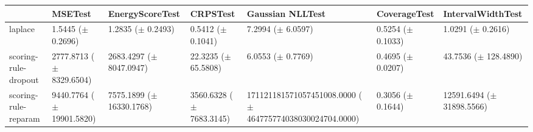 \begin{tabular}{lllllll}
\toprule
 & MSETest & EnergyScoreTest & CRPSTest & Gaussian NLLTest & CoverageTest & IntervalWidthTest \\
\midrule
laplace & \makecell{1.5445 \\ ($\pm$ 0.2696)} & \makecell{1.2835 \\ ($\pm$ 0.2493)} & \makecell{0.5412 \\ ($\pm$ 0.1041)} & \makecell{7.2994 \\ ($\pm$ 6.0597)} & \makecell{0.5254 \\ ($\pm$ 0.1033)} & \makecell{1.0291 \\ ($\pm$ 0.2616)} \\
scoring-rule-dropout & \makecell{2777.8713 \\ ($\pm$ 8329.6504)} & \makecell{2683.4297 \\ ($\pm$ 8047.0947)} & \makecell{22.3235 \\ ($\pm$ 65.5808)} & \makecell{6.0553 \\ ($\pm$ 0.7769)} & \makecell{0.4695 \\ ($\pm$ 0.0207)} & \makecell{43.7536 \\ ($\pm$ 128.4890)} \\
scoring-rule-reparam & \makecell{9440.7764 \\ ($\pm$ 19901.5820)} & \makecell{7575.1899 \\ ($\pm$ 16330.1768)} & \makecell{3560.6328 \\ ($\pm$ 7683.3145)} & \makecell{171121181571057451008.0000 \\ ($\pm$ 464775774038030024704.0000)} & \makecell{0.3056 \\ ($\pm$ 0.1644)} & \makecell{12591.6494 \\ ($\pm$ 31898.5566)} \\
\bottomrule
\end{tabular}
